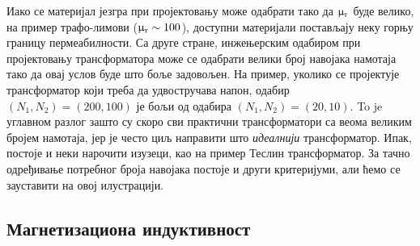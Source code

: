 \begin{center}
\end{center}

\noindent
\begin{crtice}
Иако се 
материјал језгра при пројектовању 
може одабрати тако да $\upmu_{\rm r}$ буде велико, 
на пример трафо-лимови ($\upmu_{\rm r} \sim 100$), доступни материјали
постављају неку горњу границу пермеабилности. Са друге стране, инжењерским 
одабиром при пројектовању трансформатора може се одабрати велики 
број навојака намотаја тако да овај услов буде што боље задовољен.
На пример, уколико се пројектује трансформатор који треба да 
удвостручава напон, одабир $(N_1, N_2) = (200, 100)$ је бољи 
од одабира $(N_1, N_2) = (20, 10)$. To je углавном разлог 
зашто су скоро сви практични трансформатори са веома великим 
бројем намотаја, јер је често циљ направити што \textit{идеалнији}
трансформатор. 
Ипак, постоје и неки нарочити изузеци, као на пример Теслин 
трансформатор. 
За тачно одређивање потребног 
броја навојака постоје и други критеријуми, али ћемо се 
зауставити на овој илустрацији.
\end{crtice}

\subsection{Магнетизациона индуктивност}

